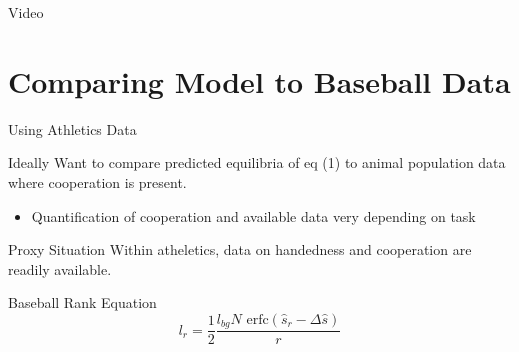 \documentclass{beamer}
\begin{document}
    \begin{frame}{Video}
    

    \end{frame}

\section{Comparing Model to Baseball Data}


    \begin{frame}{Using Athletics Data}
      \begin{block}{Ideally}
        Want to compare predicted equilibria of eq (1) to animal population data where cooperation is present.
        \begin{itemize}
            \item Quantification of cooperation and available data very depending on task 
          \end{itemize}  
      \end{block}
      \begin{block}{Proxy Situation}
        Within atheletics, data on handedness and cooperation are readily available.
      \end{block}
      \begin{block}{Baseball Rank Equation}
        \begin{equation}
        l_r = \frac{1}{2}\frac{l_{bg}N\text{ erfc}(\hat{s}_r-\Delta\hat{s})}{r}
      \end{equation}
      \end{block}
      
    \end{frame}
\end{document}
